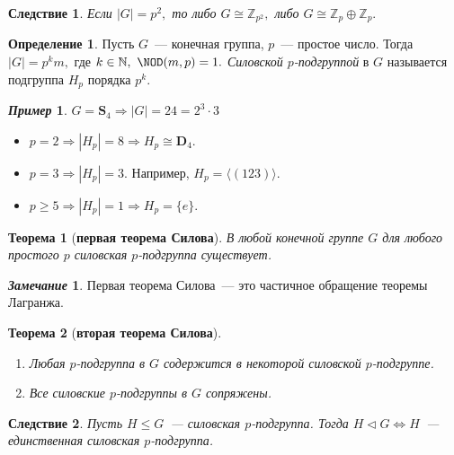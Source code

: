 \documentclass[a4paper, 14pt]{extarticle}
\newcommand{\integers}{\mathbb{Z}}
\newcommand{\naturals}{\mathbb{N}}
\newcommand{\dihedral}{\mathbf{D}}
\newcommand{\symmetrical}{\mathbf{S}}
\theoremstyle{definition}
\newtheorem*{exmpl*}{\textit{Пример}}
\newtheorem*{remark}{\textit{Замечание}}
\newtheorem{definition}{Определение}
\theoremstyle{plain}
\newtheorem*{theorem*}{Теорема}
\numberwithin{theorem}{section}
\numberwithin{definition}{section}
\numberwithin{statement}{section}
\numberwithin{lemma}{section}
\newtheorem*{consequence*}{Следствие}
\numberwithin{consequence}{section}
\begin{document}
        \begin{consequence*}
            Если ${|G| = p^2,}$ то либо ${G \cong \integers_{p^2},}$ либо ${G \cong \integers_p \oplus \integers_p.}$
        \end{consequence*}
        \begin{definition}
            Пусть $G$~--- конечная группа, $p$~--- простое число. Тогда ${|G| = p^km,}$ где ${k \in \naturals, \ \NOD(m,p) = 1.}$ \textit{Силовской $p$-подгруппой} в $G$ называется подгруппа $H_p$ порядка $p^k$.
        \end{definition}
        \begin{exmpl*}
            ${G = \symmetrical_4 \Rightarrow |G| = 24 = 2^3 \cdot 3}$
            \begin{itemize}
            \setlength\itemsep{0.1em}
                \item ${p = 2 \Rightarrow |H_p| = 8 \Rightarrow H_p \cong \dihedral_4.}$
                \item ${p = 3 \Rightarrow |H_p| = 3.}$ Например, ${H_p = \langle(123)\rangle.}$
                \item ${p \geqslant 5 \Rightarrow |H_p| = 1 \Rightarrow H_p = \{e\}.}$
            \end{itemize}
        \end{exmpl*}
        \begin{theorem*}[\textbf{первая теорема Силова}]
            В любой конечной группе $G$ для любого простого $p$ силовская $p$-подгруппа существует. 
        \end{theorem*}
        \begin{remark}
            Первая теорема Силова~--- это частичное обращение теоремы Лагранжа.
        \end{remark}
        \begin{theorem*}[\textbf{вторая теорема Силова}]
            \
            \begin{enumerate}
            \setlength\itemsep{0.1em}
                \item Любая $p$-подгруппа в $G$ содержится в некоторой силовской $p$-подгруппе. 
                \item Все силовские $p$-подгруппы в $G$ сопряжены.
            \end{enumerate}
        \end{theorem*}
        \begin{consequence*}
            Пусть ${H \leqslant G}$~--- силовская $p$-подгруппа. Тогда ${H \lhd G \Leftrightarrow H}$~--- единственная силовская $p$-подгруппа.
        \end{consequence*}
\end{document}
